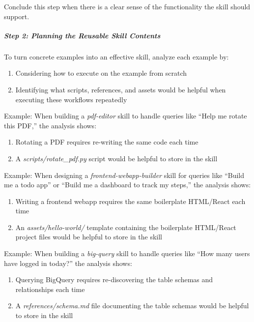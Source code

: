 \documentclass[11pt]{article}
\begin{document}
Conclude this step when there is a clear sense of the functionality the skill should support.


\subparagraph{Step 2: Planning the Reusable Skill Contents}\mbox{}\par

To turn concrete examples into an effective skill, analyze each example by:


\begin{enumerate}[leftmargin=*,itemsep=2pt,topsep=2pt]
\item {} Considering how to execute on the example from scratch
\item {} Identifying what scripts, references, and assets would be helpful when executing these workflows repeatedly
\end{enumerate}

Example: When building a \emph{pdf-editor} skill to handle queries like ``Help me rotate this PDF,'' the analysis shows:


\begin{enumerate}[leftmargin=*,itemsep=2pt,topsep=2pt]
\item {} Rotating a PDF requires re-writing the same code each time
\item {} A \emph{scripts/rotate\_\allowbreak{}pdf.py} script would be helpful to store in the skill
\end{enumerate}

Example: When designing a \emph{frontend-webapp-builder} skill for queries like ``Build me a todo app'' or ``Build me a dashboard to track my steps,'' the analysis shows:


\begin{enumerate}[leftmargin=*,itemsep=2pt,topsep=2pt]
\item {} Writing a frontend webapp requires the same boilerplate HTML/React each time
\item {} An \emph{assets/hello-world/} template containing the boilerplate HTML/React project files would be helpful to store in the skill
\end{enumerate}

Example: When building a \emph{big-query} skill to handle queries like ``How many users have logged in today?'' the analysis shows:


\begin{enumerate}[leftmargin=*,itemsep=2pt,topsep=2pt]
\item {} Querying BigQuery requires re-discovering the table schemas and relationships each time
\item {} A \emph{references/schema.md} file documenting the table schemas would be helpful to store in the skill
\end{enumerate}
\end{document}
